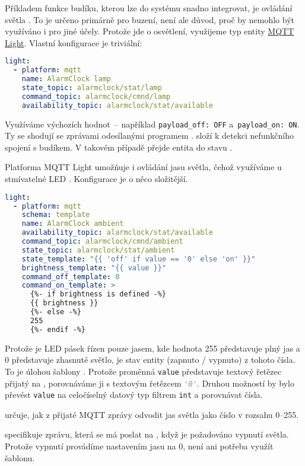 Příkladem funkce budíku, kterou lze do systému snadno integrovat, je ovládání
světla . To je určeno primárně pro buzení, není ale důvod, proč by
nemohlo být využíváno i pro jiné účely. Protože jde o osvětlení, využijeme typ
entity
\href{https://www.home-assistant.io/integrations/light.mqtt}{MQTT Light}.
Vlastní konfigurace je triviální:
\begin{lstlisting}[language=yaml]
light:
  - platform: mqtt
    name: AlarmClock lamp
    state_topic: alarmclock/stat/lamp
    command_topic: alarmclock/cmnd/lamp
    availability_topic: alarmclock/stat/available
\end{lstlisting}
Využíváme výchozích hodnot~-- například \lstinline!payload_off: OFF!
a~\lstinline!payload_on: ON!. Ty se shodují se zprávami odesílanými programem
.  složí k detekci
nefunkčního spojení s budíkem. V takovém případě přejde entita
 do stavu .

Platforma \foreignlanguage{english}{MQTT Light} umožňuje i ovládání jasu
světla, čehož využíváme u stmívatelné LED . Konfigurace je
o něco složitější.
\begin{lstlisting}[language=yaml]
light:
  - platform: mqtt
    schema: template
    name: AlarmClock ambient
    availability_topic: alarmclock/stat/available
    command_topic: alarmclock/cmnd/ambient
    state_topic: alarmclock/stat/ambient
    state_template: "{{ 'off' if value == '0' else 'on' }}"
    brightness_template: "{{ value }}"
    command_off_template: 0
    command_on_template: >
      {%- if brightness is defined -%}
      {{ brightness }}
      {%- else -%}
      255
      {%- endif -%}
\end{lstlisting}
Protože je LED pásek řízen pouze jasem, kde hodnota \num{255} představuje plný
jas a \num{0} představuje zhasnuté světlo, je stav entity (zapnuto / vypnuto)
z tohoto čísla. To je úlohou šablony . Protože proměnná
\texttt{value} představuje textový řetězec přijatý na ,
porovnáváme ji s textovým řetězcem \lstinline[language=Python]!'0'!. Druhou
možností by bylo převést \texttt{value} na celočíselný datový typ filtrem
\texttt{int} a porovnávat čísla.

 určuje, jak z přijaté MQTT zprávy odvodit jas
světla jako číslo v rozsahu \numrange{0}{255}.

 specifikuje zprávu, která se má poslat na
, když je požadováno vypnutí světla. Protože vypnutí
provádíme nastavením jasu na \num{0}, není ani potřeba využít šablonu.

